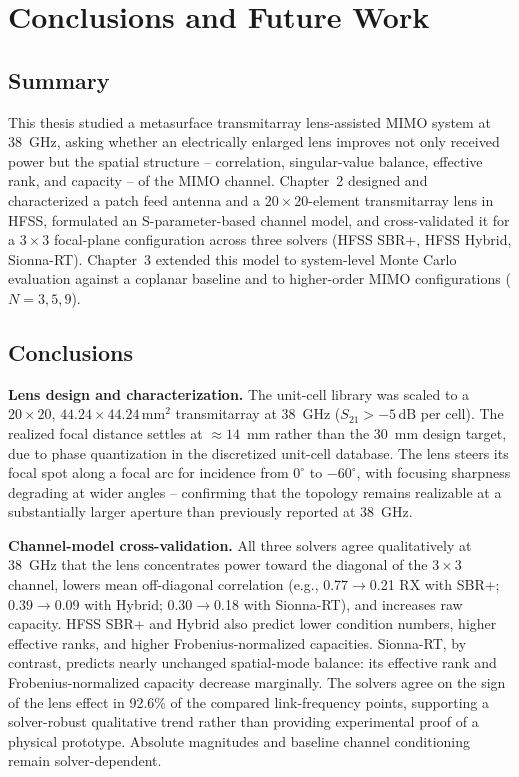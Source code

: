 \chapter{Conclusions and Future Work}

\section{Summary}
This thesis studied a metasurface transmitarray lens-assisted MIMO system at 38~GHz, asking whether an electrically enlarged lens improves not only received power but the spatial structure -- correlation, singular-value balance, effective rank, and capacity -- of the MIMO channel. Chapter~2 designed and characterized a patch feed antenna and a $20\times20$-element transmitarray lens in HFSS, formulated an S-parameter-based channel model, and cross-validated it for a $3\times3$ focal-plane configuration across three solvers (HFSS SBR+, HFSS Hybrid, Sionna-RT). Chapter~3 extended this model to system-level Monte Carlo evaluation against a coplanar baseline and to higher-order MIMO configurations ($N=3,5,9$).

\section{Conclusions}

\textbf{Lens design and characterization.} The unit-cell library was scaled to a $20\times20$, $44.24\times44.24\,\text{mm}^2$ transmitarray at 38~GHz ($S_{21}>-5\,\text{dB}$ per cell). The realized focal distance settles at $\approx14$~mm rather than the 30~mm design target, due to phase quantization in the discretized unit-cell database. The lens steers its focal spot along a focal arc for incidence from $0^\circ$ to $-60^\circ$, with focusing sharpness degrading at wider angles -- confirming that the topology remains realizable at a substantially larger aperture than previously reported at 38~GHz.

\textbf{Channel-model cross-validation.} All three solvers agree qualitatively at 38~GHz that the lens concentrates power toward the diagonal of the $3\times3$ channel, lowers mean off-diagonal correlation (e.g., 0.77$\to$0.21 RX with SBR+; 0.39$\to$0.09 with Hybrid; 0.30$\to$0.18 with Sionna-RT), and increases raw capacity. HFSS SBR+ and Hybrid also predict lower condition numbers, higher effective ranks, and higher Frobenius-normalized capacities. Sionna-RT, by contrast, predicts nearly unchanged spatial-mode balance: its effective rank and Frobenius-normalized capacity decrease marginally. The solvers agree on the sign of the lens effect in 92.6\% of the compared link-frequency points, supporting a solver-robust qualitative trend rather than providing experimental proof of a physical prototype. Absolute magnitudes and baseline channel conditioning remain solver-dependent.

